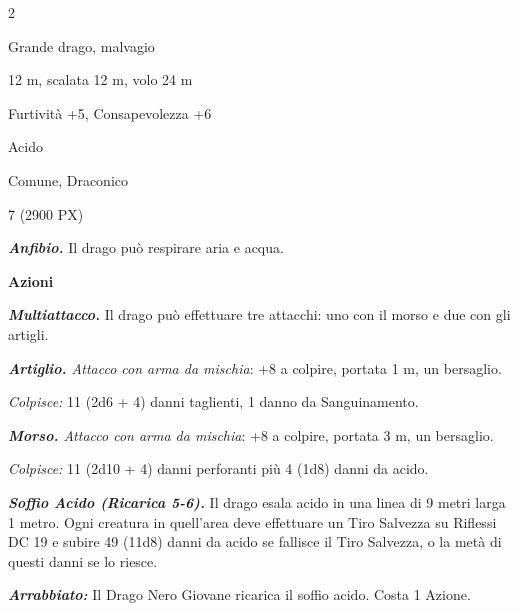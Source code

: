 \begin{multicols}{2}
{
\begin{description}[noitemsep, topsep=0pt, parsep=0pt, partopsep=0pt, itemsep=1pt, leftmargin=2.35cm,  labelwidth=2.2cm, itemindent=0cm, listparindent=0pt] %
\setlength{\baselineskip}{10pt}
\item[\textbf{Taglia/Tipo}] Grande drago, malvagio
\item[\textbf{Caratt.}] 
\item[\textbf{Punti Ferita}] 
\item[\textbf{Movimento}] 12 m, scalata 12 m, volo 24 m
\item[\textbf{Tiri Salvez.}] 
\item[\textbf{Comp.}] Furtività +5, Consapevolezza +6
\item[\textbf{Imm. Danni}] Acido
\item[\textbf{Sensi}] 
\item[\textbf{Linguaggi}] Comune, Draconico
\item[\textbf{Sfida}] 7 (2900 PX)
\end{description}
\smallskip

\emph{\textbf{Anfibio.}} Il drago può respirare aria e acqua.

\textbf{Azioni}

\emph{\textbf{Multiattacco.}} Il drago può effettuare tre attacchi: uno con il morso e due con gli artigli.

\emph{\textbf{Artiglio.} Attacco con arma da mischia}: +8 a colpire, portata 1 m, un bersaglio.

\emph{Colpisce:} 11 (2d6 + 4) danni taglienti, 1 danno da Sanguinamento.

\emph{\textbf{Morso.} Attacco con arma da mischia}: +8 a colpire, portata 3 m, un bersaglio.

\emph{Colpisce:} 11 (2d10 + 4) danni perforanti più 4 (1d8) danni da acido.

\emph{\textbf{Soffio Acido (Ricarica 5-6).}} Il drago esala acido in una linea di 9 metri larga 1 metro. Ogni creatura in quell'area deve effettuare un Tiro Salvezza su Riflessi DC 19 e subire 49 (11d8) danni da acido se fallisce il Tiro Salvezza, o la metà di questi danni se lo riesce.

\emph{\textbf{Arrabbiato:}} Il Drago Nero Giovane ricarica il soffio acido. Costa 1 Azione.

}
\end{multicols}
